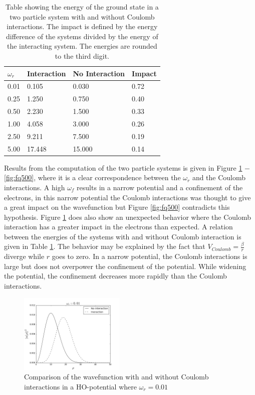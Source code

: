 \documentclass[twoside,twocolumn]{article}
\begin{document}
	\begin{table}[p]
		\begin{tabular}{|l|l|l|l|}\hline
			$\omega_r$ & Interaction & No Interaction & Impact\\ \hline
			0.01 & 0.105 & 0.030 & 0.72\\
			0.25 & 1.250  & 0.750 & 0.40\\
			0.50 & 2.230 & 1.500 &  0.33\\
			1.00 & 4.058 & 3.000 &  0.26\\
			2.50 & 9.211 & 7.500 & 0.19\\
			5.00 & 17.448 & 15.000 & 0.14\\ \hline
		\end{tabular}
		\caption{Table showing the energy of the ground state in a two particle system with and without Coulomb interactions. The impact is defined by the energy difference of the systems divided by the energy of the interacting system. The energies are rounded to the third digit.}\label{tbl:Coulomb}
	\end{table}
	Results from the computation of the two particle systems is given in Figure \ref{fig:fq001} $-$ \ref{fig:fq500}, where it is a clear correspondence between the $\omega_r$ and the Coulomb interactions. A high $\omega_f$ results in a narrow potential and a confinement of the electrons, in this narrow potential the Coulomb interactions was thought to give a great impact on the wavefunction but Figure \ref{fig:fq500} contradicts this hypothesis. Figure \ref{fig:fq001} does also show an unexpected behavior where the Coulomb interaction has a greater impact in the electrons than expected. A relation between the energies of the systems with and without Coulomb interaction is given in Table \ref{tbl:Coulomb}. The behavior may be explained by the fact that $V_{Coulomb}=\frac{\beta}{r}$ diverge while $r$ goes to zero. In a narrow potential, the Coulomb interactions is large but does not overpower the confinement of the potential. While widening the potential, the confinement decreases more rapidly than the Coulomb interactions.
	\begin{figure}[p]
		\includegraphics[width=0.45\textwidth]{../report/figures/freq001.png} 
		\caption{Comparison of the wavefunction with and without Coulomb interactions in a HO-potential where $\omega_r=0.01$}\label{fig:fq001}
	\end{figure}
	
\end{document}

